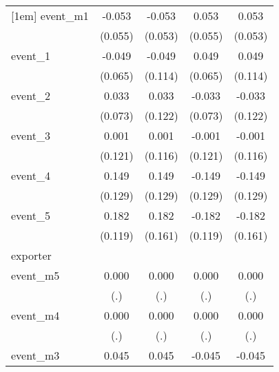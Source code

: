 {\begin{tabular}{l*{4}{c}}
[1em]
event\_m1    &      -0.053         &      -0.053         &       0.053         &       0.053         \\
            &     (0.055)         &     (0.053)         &     (0.055)         &     (0.053)         \\
[1em]
event\_1     &      -0.049         &      -0.049         &       0.049         &       0.049         \\
            &     (0.065)         &     (0.114)         &     (0.065)         &     (0.114)         \\
[1em]
event\_2     &       0.033         &       0.033         &      -0.033         &      -0.033         \\
            &     (0.073)         &     (0.122)         &     (0.073)         &     (0.122)         \\
[1em]
event\_3     &       0.001         &       0.001         &      -0.001         &      -0.001         \\
            &     (0.121)         &     (0.116)         &     (0.121)         &     (0.116)         \\
[1em]
event\_4     &       0.149         &       0.149         &      -0.149         &      -0.149         \\
            &     (0.129)         &     (0.129)         &     (0.129)         &     (0.129)         \\
[1em]
event\_5     &       0.182         &       0.182         &      -0.182         &      -0.182         \\
            &     (0.119)         &     (0.161)         &     (0.119)         &     (0.161)         \\
\hline
exporter    &                     &                     &                     &                     \\
event\_m5    &       0.000         &       0.000         &       0.000         &       0.000         \\
            &         (.)         &         (.)         &         (.)         &         (.)         \\
[1em]
event\_m4    &       0.000         &       0.000         &       0.000         &       0.000         \\
            &         (.)         &         (.)         &         (.)         &         (.)         \\
[1em]
event\_m3    &       0.045         &       0.045         &      -0.045         &      -0.045         \\

\end{tabular}}

